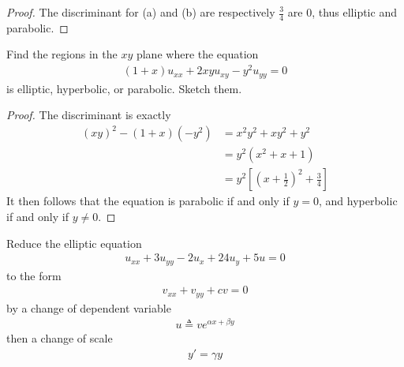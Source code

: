 \documentclass{report}
\begin{document}
\begin{proof}
The discriminant for (a) and (b) are respectively  $\frac{3}{4}$ are $0$, thus elliptic and parabolic. 
\end{proof}
\begin{question}{}{}
Find the regions in the $xy$ plane where the equation 
 \begin{align*}
   (1+x)u_{xx}+2xyu_{xy}-y^2u_{yy}=0
\end{align*}
is elliptic, hyperbolic, or parabolic. Sketch them. 
\end{question}
\begin{proof}
The discriminant is exactly 
\begin{align*}
  (xy)^2- (1+x)(-y^2)&=x^2y^2+xy^2+y^2\\
  &=y^2 (x^2+x+1)\\
  &=y^2[(x+\frac{1}{2})^2+ \frac{3}{4}]
\end{align*}
It then follows that the equation is parabolic if and only if $y=0$, and hyperbolic if and only if  $y\neq 0$. 

\end{proof}
\begin{question}{}{}
Reduce the elliptic equation 
\begin{align*}
u_{xx}+3u_{yy}-2u_x+24u_y+5u=0
\end{align*}
to the form 
\begin{align*}
v_{xx}+v_{yy}+cv=0
\end{align*}
by a change of dependent variable 
\begin{align*}
u\triangleq ve^{\alpha x+\beta  y}
\end{align*}
then a change of scale 
\begin{align*}
y'=\gamma y
\end{align*}
\end{question}
\end{document}
